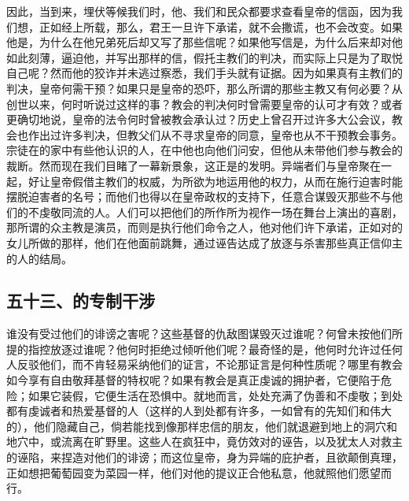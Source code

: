 因此，当到来，埋伏等候我们时，他、我们和民众都要求查看皇帝的信函，因为我们想，正如经上所载，那么，君王一旦许下承诺，就不会撒谎，也不会改变。如果他是，为什么在他兄弟死后却又写了那些信呢？如果他写信是，为什么后来却对他如此刻薄，逼迫他，并写出那样的信，假托主教们的判决，而实际上只是为了取悦自己呢？然而他的狡诈并未逃过察悉，我们手头就有证据。因为如果真有主教们的判决，皇帝何需干预？如果只是皇帝的恐吓，那么所谓的那些主教又有何必要？从创世以来，何时听说过这样的事？教会的判决何时曾需要皇帝的认可才有效？或者更确切地说，皇帝的法令何时曾被教会承认过？历史上曾召开过许多大公会议，教会也作出过许多判决，但教父们从不寻求皇帝的同意，皇帝也从不干预教会事务。宗徒在的家中有些他认识的人，在中他也向他们问安，但他从未带他们参与教会的裁断。然而现在我们目睹了一幕新景象，这正是的发明。异端者们与皇帝聚在一起，好让皇帝假借主教们的权威，为所欲为地运用他的权力，从而在施行迫害时能摆脱迫害者的名号；而他们也得以在皇帝政权的支持下，任意合谋毁灭那些不与他们的不虔敬同流的人。人们可以把他们的所作所为视作一场在舞台上演出的喜剧，那所谓的众主教是演员，而则是执行他们命令之人，他对他们许下承诺，正如对的女儿所做的那样，他们在他面前跳舞，通过诬告达成了放逐与杀害那些真正信仰主的人的结局。\par


\subsection{五十三、的专制干涉}

谁没有受过他们的诽谤之害呢？这些基督的仇敌图谋毁灭过谁呢？何曾未按他们所提的指控放逐过谁呢？他何时拒绝过倾听他们呢？最奇怪的是，他何时允许过任何人反驳他们，而不肯轻易采纳他们的证言，不论那证言是何种性质呢？哪里有教会如今享有自由敬拜基督的特权呢？如果有教会是真正虔诚的拥护者，它便陷于危险；如果它装假，它便生活在恐惧中。就地而言，处处充满了伪善和不虔敬；到处都有虔诚者和热爱基督的人（这样的人到处都有许多，一如曾有的先知们和伟大的），他们隐藏自己，倘若能找到像那样忠信的朋友，他们就退避到地上的洞穴和地穴中，或流离在旷野里。这些人在疯狂中，竟仿效对的诬告，以及犹太人对救主的诬陷，来捏造对他们的诽谤；而这位皇帝，身为异端的庇护者，且欲颠倒真理，正如想把葡萄园变为菜园一样，他们对他的提议正合他私意，他就照他们愿望而行。\par

